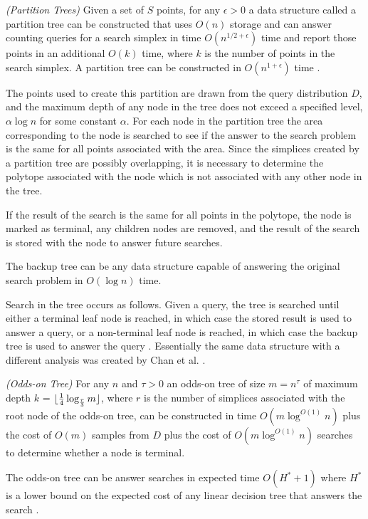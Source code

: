 \documentclass[mcs]{scsthesis}
\begin{document}
\begin{thm} \emph{(Partition Trees)} 
Given a set of \(S\) points, for any \(\epsilon > 0\) a data structure called
a partition tree can be constructed that uses \(O(n)\) storage and can answer
counting queries for a search simplex in time \(O(n^{1/2 + \epsilon})\) time and
report those points in an additional \(O(k)\) time, where \(k\) is the number
of points in the search simplex. A partition tree can be constructed in
\(O(n^{1 + \epsilon})\) time \cite{dutch}.
\end{thm}

The points used to create this partition are drawn from the query distribution
\(D\), and the maximum depth of any node in the tree does not exceed a specified
level, \(\alpha \log n\) for some constant \(\alpha\). For each node in the
partition tree the area corresponding to the node is searched to see if the
answer to the search problem is the same for all points associated with the
area. Since the simplices created by a partition tree are possibly overlapping,
it is necessary to determine the polytope associated with the node which is not
associated with any other node in the tree.

If the result of the search is the same for all points in the polytope, the node
is marked as terminal, any children nodes are removed, and the result of the
search is stored with the node to answer future searches.

The backup tree can be any data structure capable of answering the original
search problem in \(O(\log n)\) time.

Search in the tree occurs as follows. Given a query, the tree is searched until
either a terminal leaf node is reached, in which case the stored result is used
to answer a query, or a non-terminal leaf node is reached, in which case the
backup tree is used to answer the query \cite{oddson}. Essentially the same data
structure with a different analysis was created by Chan et al. \cite{chan}.

\begin{thm} \emph{(Odds-on Tree)}
For any \(n\) and \(\tau>0\) an odds-on tree of size \(m = n^\tau\) of maximum
depth \(k\) = \(\lfloor {1 \over 4} \log_{r \over 3} m \rfloor \), where \(r\)
is the number of simplices associated with the root node of the odds-on tree,
can be constructed in time \(O(m \log^{O(1)} n)\) plus the cost of \(O(m)\)
samples from \(D\) plus the cost of \(O(m \log^{O(1)} n)\) searches to determine
whether a node is terminal.

The odds-on tree can be answer searches in expected time \(O(H^* + 1)\) where
\(H^*\) is a lower bound on the expected cost of any linear decision tree
that answers the search \cite{oddson}.  
\end{thm}
\end{document}

